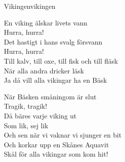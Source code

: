 \begin{song}{Vikingen}{vikingen}
\begin{vers}
En viking älskar livets vann\\
Hurra, hurra!\\
Det hastigt i hans svalg försvann\\
Hurra, hurra!\\
Till kalv, till oxe, till fisk och till fläsk\\
När alla andra dricker läsk\\
Ja då vill alla vikingar ha en Bäsk\\
\end{vers}
\begin{vers}
När Bäsken småningom är slut\\
Tragik, tragik!\\
Då bäres varje viking ut\\
Som lik, sej lik\\
Och sen när vi vaknar vi sjunger en bit\\
Och korkar upp en Skånes Aquavit\\
\repopen Skål för alla vikingar som kom hit! \repclose\\
\end{vers}
\end{song}

